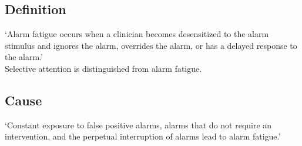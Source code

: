 \subsection{Definition}

`Alarm fatigue occurs when a clinician becomes desensitized to the alarm stimulus and ignores the alarm, overrides the alarm, or has a delayed response to the alarm.' \\

Selective attention is distinguished from alarm fatigue.

\subsection{Cause}

`Constant exposure to false positive alarms, alarms that do not require an intervention, and the perpetual interruption of alarms lead to alarm fatigue.'

